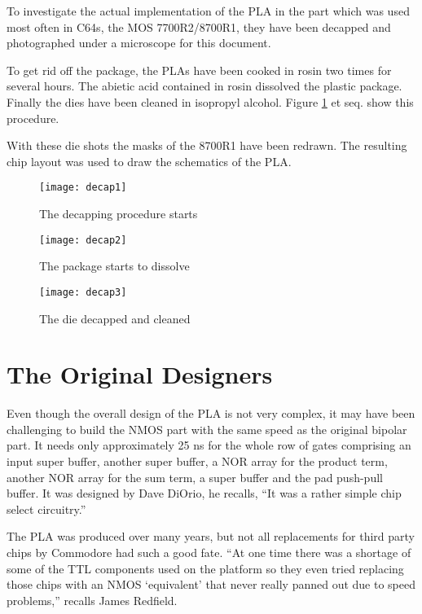 To investigate the actual implementation of the PLA in the part which was
used most often in C64s, the MOS 7700R2/8700R1, they have been decapped and
photographed under a microscope for this document.

To get rid off the package, the PLAs have been cooked in rosin two times for
several hours. The abietic acid contained in rosin dissolved the plastic
package. Finally the dies have been cleaned in isopropyl
alcohol. Figure \ref{fig:decap1} et seq. show this procedure.

With these die shots the masks of the 8700R1 have been redrawn. The resulting
chip layout was used to draw the schematics of the PLA.

\begin{figure}
    \centering
    \texttt{[image: decap1]}
    \caption{The decapping procedure starts}
    \label{fig:decap1}
\end{figure}
\begin{figure}
    \centering
    \texttt{[image: decap2]}
    \caption{The package starts to dissolve}
    \label{fig:decap2}
\end{figure}
\begin{figure}
    \centering
    \texttt{[image: decap3]}
    \caption{The die decapped and cleaned}
    \label{fig:decap3}
\end{figure}

\section{The Original Designers}

Even though the overall design of the PLA is not very complex, it may
have been challenging to build the NMOS part with the same speed as the
original bipolar part. It needs only approximately 25 ns for the whole row
of gates comprising an input super buffer, another super buffer, a NOR array
for the product term, another NOR array for the sum term, a super buffer and
the pad push-pull buffer. It was designed by Dave DiOrio, he recalls, ``It
was a rather simple chip select circuitry.''

The PLA was produced over many years, but not all replacements for third
party chips by Commodore had such a good fate. ``At one time there was a
shortage of some of the TTL components used on the platform so they even
tried replacing those chips with an NMOS `equivalent' that never really
panned out due to speed problems,'' recalls James Redfield.

